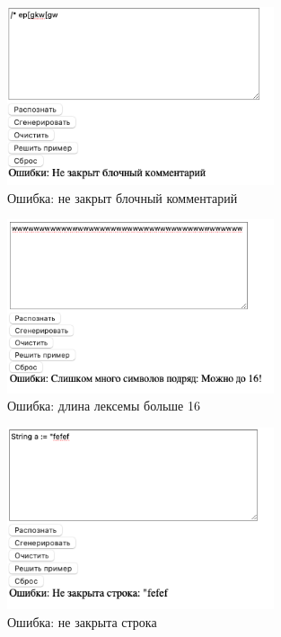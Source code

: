 \documentclass[areasetadvanced]{scrartcl}
\begin{document}
\begin{figure}[H]
    \centering
    \includegraphics[width=0.7\textwidth]{ErrorComment.png}
    \caption{Ошибка: не закрыт блочный комментарий}
    \label{fig:syntdiag}
\end{figure}

\begin{figure}[H]
    \centering
    \includegraphics[width=0.7\textwidth]{More16.png}
    \caption{Ошибка: длина лексемы больше 16}
    \label{fig:syntdiag}
\end{figure}

\begin{figure}[H]
    \centering
    \includegraphics[width=0.7\textwidth]{StringError.png}
    \caption{Ошибка: не закрыта строка}
    \label{fig:syntdiag}
\end{figure}
\end{document}
